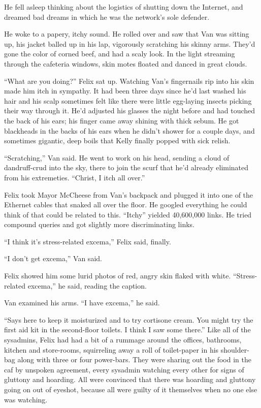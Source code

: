 He fell asleep thinking about the logistics of shutting down the
Internet, and dreamed bad dreams in which he was the network’s sole
defender.

He woke to a papery, itchy sound. He rolled over and saw that Van
was sitting up, his jacket balled up in his lap, vigorously
scratching his skinny arms. They’d gone the color of corned beef,
and had a scaly look. In the light streaming through the cafeteria
windows, skin motes floated and danced in great clouds.

“What are you doing?” Felix sat up. Watching Van’s fingernails rip
into his skin made him itch in sympathy. It had been three days
since he’d last washed his hair and his scalp sometimes felt like
there were little egg-laying insects picking their way through it.
He’d adjusted his glasses the night before and had touched the back
of his ears; his finger came away shining with thick sebum. He got
blackheads in the backs of his ears when he didn’t shower for a
couple days, and sometimes gigantic, deep boils that Kelly finally
popped with sick relish.

“Scratching,” Van said. He went to work on his head, sending a
cloud of dandruff-crud into the sky, there to join the scurf that
he’d already eliminated from his extremeties. “Christ, I itch all
over.”

Felix took Mayor McCheese from Van’s backpack and plugged it into
one of the Ethernet cables that snaked all over the floor. He
googled everything he could think of that could be related to this.
“Itchy” yielded 40,600,000 links. He tried compound queries and got
slightly more discriminating links.

“I think it’s stress-related excema,” Felix said, finally.

“I don’t get excema,” Van said.

Felix showed him some lurid photos of red, angry skin flaked with
white. “Stress-related excema,” he said, reading the caption.

Van examined his arms. “I have excema,” he said.

“Says here to keep it moisturized and to try cortisone cream. You
might try the first aid kit in the second-floor toilets. I think I
saw some there.” Like all of the sysadmins, Felix had had a bit of
a rummage around the offices, bathrooms, kitchen and store-rooms,
squirreling away a roll of toilet-paper in his shoulder-bag along
with three or four power-bars. They were sharing out the food in
the caf by unspoken agreement, every sysadmin watching every other
for signs of gluttony and hoarding. All were convinced that there
was hoarding and gluttony going on out of eyeshot, because all were
guilty of it themselves when no one else was watching.

